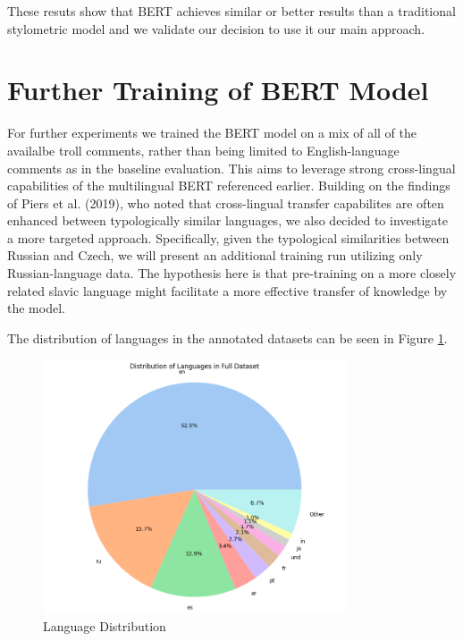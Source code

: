 \documentclass[twoside]{ctuthesis}
\theoremstyle{plain}
\theoremstyle{definition}
\theoremstyle{note}
\begin{document}
These resuts show that BERT achieves similar or better results than a traditional stylometric model and we validate our decision to use it our main approach.

\section{Further Training of BERT Model}

For further experiments we trained the BERT model on a mix of all of the availalbe troll comments, rather than being limited to English-language comments as in the baseline evaluation. This aims to leverage strong cross-lingual capabilities of the multilingual BERT referenced earlier\cite{Pires2019}. Building on the findings of Piers et al. (2019), who noted that cross-lingual transfer capabilites are often enhanced between typologically similar languages, we also decided to investigate a more targeted approach. Specifically, given the typological similarities between Russian and Czech, we will present an additional training run utilizing only Russian-language data. The hypothesis here is that pre-training on a more closely related slavic language might facilitate a more effective transfer of knowledge by the model.\par
The distribution of languages in the annotated datasets can be seen in Figure \ref{fig:language_distribution}.\par 

\begin{figure}[h]
    \centering
    \includegraphics[width=0.8\textwidth]{figures/language_distribution.png}
    \caption{Language Distribution}
    \label{fig:language_distribution}
\end{figure}
\end{document}
